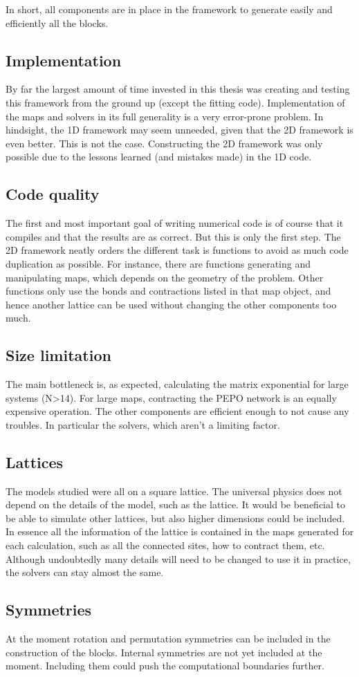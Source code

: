 
In short, all components are in place in the framework to generate easily and efficiently all the blocks.

\subsection{Implementation}

By far the largest amount of time invested in this thesis was creating and testing this framework from the ground up (except the fitting code). Implementation of the maps and solvers in its full generality is a very error-prone problem. In hindsight, the 1D framework may seem unneeded, given that the 2D framework is even better. This is not the case. Constructing the 2D framework was only possible due to the lessons learned (and mistakes made) in the 1D code.

\subsection{Code quality}
The first and most important goal of writing numerical code is of course that it compiles and that the results are as correct. But this is only the first step. The 2D framework neatly orders the different task is functions to avoid as much code duplication as possible. For instance, there are functions generating and manipulating maps, which depends on the geometry of the problem. Other functions only use the bonds and contractions listed in that map object, and hence another lattice can be used without changing the other components too much.

\subsection{Size limitation}
The main bottleneck is, as expected, calculating the matrix exponential for large systems (N>14). For large maps, contracting the PEPO network is an equally expensive operation. The other components are efficient enough to not cause any troubles. In particular the solvers, which aren't a limiting factor.

\subsection{Lattices}
The models studied were all on a square lattice. The universal physics does not depend on the details of the model, such as the lattice. It would be beneficial to be able to simulate other lattices, but also higher dimensions could be included. In essence all the information of the lattice is contained in the maps generated for each calculation, such as all the connected sites, how to contract them, etc. Although undoubtedly many details will need to be changed to use it in practice, the solvers can stay almost the same.

\subsection{Symmetries}

At the moment rotation and permutation symmetries can be included in the construction of the blocks. Internal symmetries are not yet included at the moment. Including them could push the computational boundaries further.

